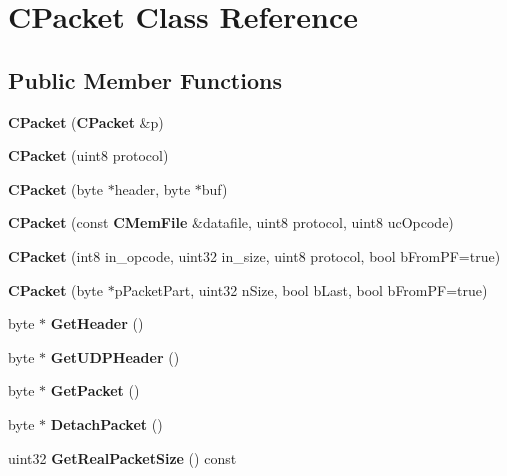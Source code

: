 \section{CPacket Class Reference}
\label{classCPacket}
\subsection*{Public Member Functions}
\begin{DoxyCompactItemize}
\item 
{\bfseries CPacket} ({\bf CPacket} \&p)\label{classCPacket_ab0962f6733f088d304c8b8f25505a617}

\item 
{\bfseries CPacket} (uint8 protocol)\label{classCPacket_a02f015001355333b9a4c04d77cfe621c}

\item 
{\bfseries CPacket} (byte $\ast$header, byte $\ast$buf)\label{classCPacket_a14cfca8b31ed3051abfe1e519accb7d9}

\item 
{\bfseries CPacket} (const {\bf CMemFile} \&datafile, uint8 protocol, uint8 ucOpcode)\label{classCPacket_aebab2c7f9290abcd5ef4474e6eeaa73b}

\item 
{\bfseries CPacket} (int8 in\_\-opcode, uint32 in\_\-size, uint8 protocol, bool bFromPF=true)\label{classCPacket_aaec002dbf9e73fff4f4f1e3bac3e38d3}

\item 
{\bfseries CPacket} (byte $\ast$pPacketPart, uint32 nSize, bool bLast, bool bFromPF=true)\label{classCPacket_a37d1389a3efd52b89b75c1497178765c}

\item 
byte $\ast$ {\bfseries GetHeader} ()\label{classCPacket_ac8b2d8a37523660b617f502c4b12ce09}

\item 
byte $\ast$ {\bfseries GetUDPHeader} ()\label{classCPacket_a2c60d4c90be664db43af8e47d4f3e274}

\item 
byte $\ast$ {\bfseries GetPacket} ()\label{classCPacket_ac653af576f8088c0a7240139e3f1ed9f}

\item 
byte $\ast$ {\bfseries DetachPacket} ()\label{classCPacket_a4c46cf749182885115c9120867e10a6f}

\item 
uint32 {\bfseries GetRealPacketSize} () const \label{classCPacket_ac08cb887db3e55f65b5d01addb5f5a87}


\end{DoxyCompactItemize}
